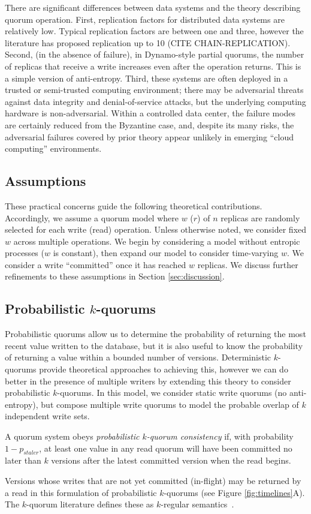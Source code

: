 \documentclass{vldb}
\begin{document}
There are significant differences between data systems and the theory
describing quorum operation.  First, replication factors for
distributed data systems are relatively low.  Typical replication
factors are between one and three, however the literature has proposed
replication up to 10 (CITE CHAIN-REPLICATION).  Second, (in the
absence of failure), in Dynamo-style partial quorums, the number of
replicas that receive a write increases even after the operation
returns.  This is a simple version of anti-entropy.  Third, these
systems are often deployed in a trusted or semi-trusted computing
environment; there may be adversarial threats against data integrity
and denial-of-service attacks, but the underlying computing hardware
is non-adversarial. Within a controlled data center, the failure modes
are certainly reduced from the Byzantine case, and, despite its many
risks, the adversarial failures covered by prior theory appear
unlikely in emerging ``cloud computing'' environments.

\subsection{Assumptions}

These practical concerns guide the following theoretical
contributions.  Accordingly, we assume a quorum model where $w$ ($r$)
of $n$ replicas are randomly selected for each write (read) operation.
Unless otherwise noted, we consider fixed $w$ across multiple
operations.  We begin by considering a model without entropic
processes ($w$ is constant), then expand our model to consider
time-varying $w$. We consider a write ``committed'' once it has
reached $w$ replicas. We discuss further refinements to these
assumptions in Section \ref{sec:discussion}.

\subsection{Probabilistic $k$-quorums}

Probabilistic quorums allow us to determine the probability of
returning the most recent value written to the database, but it is
also useful to know the probability of returning a value within a
bounded number of versions.  Deterministic $k$-quorums provide
theoretical approaches to achieving this, however we can do better in
the presence of multiple writers by extending this theory to consider
probabilistic $k$-quorums.  In this model, we consider static write
quorums (no anti-entropy), but compose multiple write quorums to model the probable overlap of $k$ independent write sets.
\begin{definition}
A quorum system obeys \textit{probabilistic $k$-quorum consistency} if, with
probability $1-p_{staler}$, at least one value in any read quorum will
have been committed no later than $k$ versions after the latest committed
version when the read begins.
\end{definition}
Versions whose writes that are not yet committed (in-flight) may be
returned by a read in this formulation of probabilistic $k$-quorums
(see Figure \ref{fig:timelines}A).  The $k$-quorum literature defines these as $k$-regular semantics~\cite{nonstrict-availability}.
\end{document}
